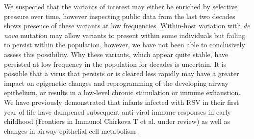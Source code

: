 \documentclass{article}
\begin{document}
We suspected that the variants of interest may either be enriched by selective pressure over time, however inspecting public data from the last two decades shows presence of these variants at low frequencies.
Within-host variation with \textit{de novo} mutation may allow variants to present within some individuals but failing to persist within the population, however, we have not been able to conclusively assess this possibility.
Why these variants, which appear quite stable, have persisted at low frequency in the population for decades is uncertain. 
It is possible that a virus that persists or is cleared less rapidly may have a greater impact on epigenetic changes and reprogramming of the developing airway epithelium, or results in a low-level chronic stimulation or immune exhaustion. 
We have previously demonstrated that infants infected with RSV in their first year of life have dampened subsequent anti-viral immune responses in early childhood (Frontiers in Immunol Chirkova T et al. under review) as well as changes in airway epithelial cell metabolism 
\cite{connelly2021metabolic}.
\end{document}

